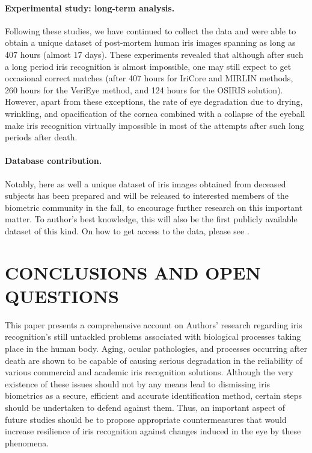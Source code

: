 \documentclass[a4paper,twoside]{article}
\begin{document}
 \paragraph{Experimental study: long-term analysis.} 
 Following these studies, we have continued to collect the data and were able to obtain a unique dataset of post-mortem human iris images spanning as long as 407 hours (almost 17 days). These experiments revealed that although after such a long period iris recognition is almost impossible, one may still expect to get occasional correct matches (after 407 hours for IriCore and MIRLIN methods, 260 hours for the VeriEye method, and 124 hours for the OSIRIS solution). However, apart from these exceptions, the rate of eye degradation due to drying, wrinkling, and opacification of the cornea combined with a collapse of the eyeball make iris recognition virtually impossible in most of the attempts after such long periods after death. 

\paragraph{Database contribution.} Notably, here as well a unique dataset of iris images obtained from deceased subjects has been prepared and will be released to interested members of the biometric community in the fall, to encourage further research on this important matter. To author's best knowledge, this will also be the first publicly available dataset of this kind. On how to get access to the data, please see \cite{WarsawColdIris1}.  

\vfill

\section{\uppercase{Conclusions and open questions}}
\label{sec:Future}
This paper presents a comprehensive account on Authors' research regarding iris recognition's still untackled problems associated with biological processes taking place in the human body. Aging, ocular pathologies, and processes occurring after death are shown to be capable of causing serious degradation in the reliability of various commercial and academic iris recognition solutions. Although the very existence of these issues should not by any means lead to dismissing iris biometrics as a secure, efficient and accurate identification method, certain steps should be undertaken to defend against them. Thus, an important aspect of future studies should be to propose appropriate countermeasures that would increase resilience of iris recognition against changes induced in the eye by these phenomena. 
\end{document}
